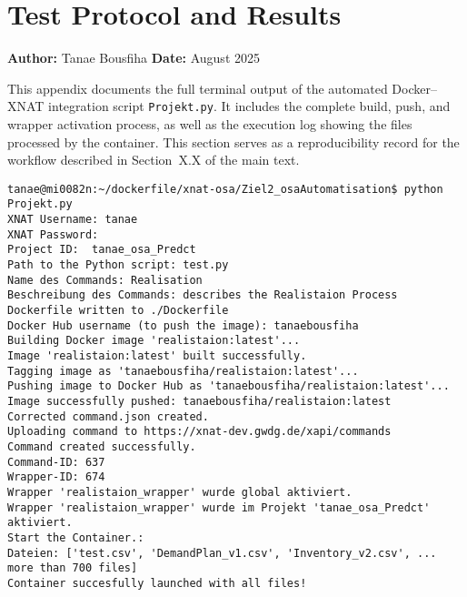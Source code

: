 
    
\appendix
\section{Test Protocol and Results}
\label{app:test}

\noindent\textbf{Author:} Tanae Bousfiha  
\noindent\textbf{Date:} August 2025  

\noindent This appendix documents the full terminal output of the automated Docker–XNAT integration script
\texttt{Projekt.py}.  
It includes the complete build, push, and wrapper activation process, as well as the execution log showing the files processed by the container.  
This section serves as a reproducibility record for the workflow described in Section~X.X of the main text.

\begin{lstlisting}
tanae@mi0082n:~/dockerfile/xnat-osa/Ziel2_osaAutomatisation$ python Projekt.py
XNAT Username: tanae
XNAT Password:
Project ID:  tanae_osa_Predct
Path to the Python script: test.py
Name des Commands: Realisation
Beschreibung des Commands: describes the Realistaion Process
Dockerfile written to ./Dockerfile
Docker Hub username (to push the image): tanaebousfiha
Building Docker image 'realistaion:latest'...
Image 'realistaion:latest' built successfully.
Tagging image as 'tanaebousfiha/realistaion:latest'...
Pushing image to Docker Hub as 'tanaebousfiha/realistaion:latest'...
Image successfully pushed: tanaebousfiha/realistaion:latest
Corrected command.json created.
Uploading command to https://xnat-dev.gwdg.de/xapi/commands
Command created successfully.
Command-ID: 637
Wrapper-ID: 674
Wrapper 'realistaion_wrapper' wurde global aktiviert.
Wrapper 'realistaion_wrapper' wurde im Projekt 'tanae_osa_Predct' aktiviert.
Start the Container.:
Dateien: ['test.csv', 'DemandPlan_v1.csv', 'Inventory_v2.csv', ... more than 700 files]
Container succesfully launched with all files!
\end{lstlisting}


